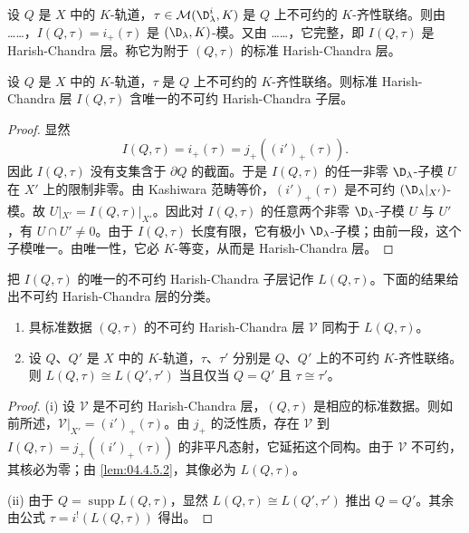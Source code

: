 设 $Q$ 是 $X$ 中的 $K$-轨道，$\tau\in\mathcal{M}(\D^i_\lambda,K)$ 是 $Q$ 上不可约的 $K$-齐性联络。则由 ……，$I(Q,\tau)=i_+(\tau)$ 是 $(\D_\lambda,K)$-模。又由 ……，它完整，即 $I(Q,\tau)$ 是 Harish-Chandra 层。称它为附于 $(Q,\tau)$ 的标准 Harish-Chandra 层。

\begin{lemma}\label{lem:04.4.5.2}
设 $Q$ 是 $X$ 中的 $K$-轨道，$\tau$ 是 $Q$ 上不可约的 $K$-齐性联络。则标准 Harish-Chandra 层 $I(Q,\tau)$ 含唯一的不可约 Harish-Chandra 子层。
\end{lemma}

\begin{proof}
显然
$$I(Q,\tau)=i_+(\tau)=j_+((i')_+(\tau)).$$
因此 $I(Q,\tau)$ 没有支集含于 $\partial Q$ 的截面。于是 $I(Q,\tau)$ 的任一非零 $\D_\lambda$-子模 $U$ 在 $X'$ 上的限制非零。由 Kashiwara 范畴等价，$(i')_+(\tau)$ 是不可约 $(\D_\lambda|_{X'})$-模。故 $U|_{X'}=I(Q,\tau)|_{X'}$。因此对 $I(Q,\tau)$ 的任意两个非零 $\D_\lambda$-子模 $U$ 与 $U'$，有 $U\cap U'\neq 0$。由于 $I(Q,\tau)$ 长度有限，它有极小 $\D_\lambda$-子模；由前一段，这个子模唯一。由唯一性，它必 $K$-等变，从而是 Harish-Chandra 层。
\end{proof}

把 $I(Q,\tau)$ 的唯一的不可约 Harish-Chandra 子层记作 $L(Q,\tau)$。下面的结果给出不可约 Harish-Chandra 层的分类。

\begin{theorem}\label{thm:04.4.5.3}
\begin{enumerate}[label=(\roman*)]
\item 具标准数据 $(Q,\tau)$ 的不可约 Harish-Chandra 层 $\mathcal{V}$ 同构于 $L(Q,\tau)$。
\item 设 $Q$、$Q'$ 是 $X$ 中的 $K$-轨道，$\tau$、$\tau'$ 分别是 $Q$、$Q'$ 上的不可约 $K$-齐性联络。则 $L(Q,\tau)\cong L(Q',\tau')$ 当且仅当 $Q=Q'$ 且 $\tau\cong\tau'$。
\end{enumerate}
\end{theorem}

\begin{proof}
(i) 设 $\mathcal{V}$ 是不可约 Harish-Chandra 层，$(Q,\tau)$ 是相应的标准数据。则如前所述，$\mathcal{V}|_{X'}=(i')_+(\tau)$。由 $j_+$ 的泛性质，存在 $\mathcal{V}$ 到 $I(Q,\tau)=j_+((i')_+(\tau))$ 的非平凡态射，它延拓这个同构。由于 $\mathcal{V}$ 不可约，其核必为零；由 \ref{lem:04.4.5.2}，其像必为 $L(Q,\tau)$。

(ii) 由于 $Q=\operatorname{supp}L(Q,\tau)$，显然 $L(Q,\tau)\cong L(Q',\tau')$ 推出 $Q=Q'$。其余由公式 $\tau=i^!(L(Q,\tau))$ 得出。
\end{proof}
